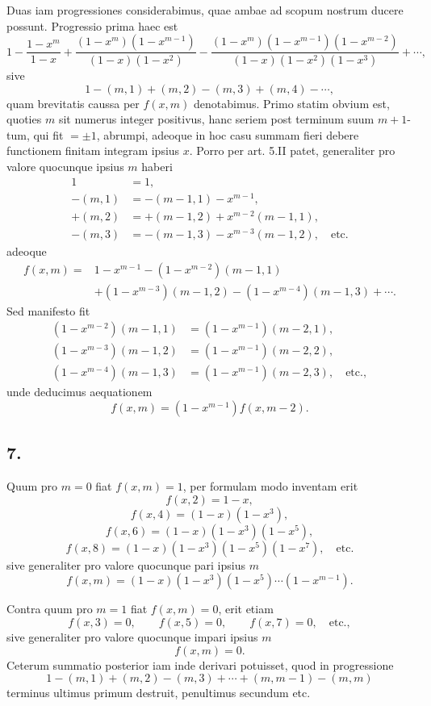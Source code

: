 \documentclass[12pt]{article}
\begin{document}
Duas iam progressiones considerabimus, quae ambae ad scopum nostrum ducere possunt. Progressio prima haec est
\[
1-\frac{1-x^m}{1-x}
+\frac{(1-x^m)(1-x^{m-1})}{(1-x)(1-x^2)}
-\frac{(1-x^m)(1-x^{m-1})(1-x^{m-2})}{(1-x)(1-x^2)(1-x^3)}
+\cdots,
\]
sive
\[
1-(m,1)+(m,2)-(m,3)+(m,4)-\cdots,
\]
quam brevitatis caussa per $f(x,m)$ denotabimus. Primo statim obvium est, quoties $m$ sit numerus integer positivus, hanc seriem post terminum suum $m+1$-tum, qui fit $=\pm1$, abrumpi, adeoque in hoc casu summam fieri debere functionem finitam integram ipsius $x$. Porro per art. 5.II patet, generaliter pro valore quocunque ipsius $m$ haberi
\[
\begin{aligned}
1&=1,\\
-(m,1)&=-(m-1,1)-x^{m-1},\\
+(m,2)&=+(m-1,2)+x^{m-2}(m-1,1),\\
-(m,3)&=-(m-1,3)-x^{m-3}(m-1,2),\quad\text{etc.}
\end{aligned}
\]
adeoque
\[
\begin{aligned}
f(x,m)=&1-x^{m-1}-(1-x^{m-2})(m-1,1)\\
&+(1-x^{m-3})(m-1,2)-(1-x^{m-4})(m-1,3)+\cdots.
\end{aligned}
\]
Sed manifesto fit
\[
\begin{aligned}
(1-x^{m-2})(m-1,1)&=(1-x^{m-1})(m-2,1),\\
(1-x^{m-3})(m-1,2)&=(1-x^{m-1})(m-2,2),\\
(1-x^{m-4})(m-1,3)&=(1-x^{m-1})(m-2,3),\quad\text{etc.},
\end{aligned}
\]
unde deducimus aequationem
\[
f(x,m)=(1-x^{m-1})f(x,m-2). \tag{1}
\]

\subsection*{7.}

Quum pro $m=0$ fiat $f(x,m)=1$, per formulam modo inventam erit
\[
f(x,2)=1-x,
\]
\[
f(x,4)=(1-x)(1-x^3),
\]
\[
f(x,6)=(1-x)(1-x^3)(1-x^5),
\]
\[
f(x,8)=(1-x)(1-x^3)(1-x^5)(1-x^7),\quad\text{etc.}
\]
sive generaliter pro valore quocunque pari ipsius $m$
\[
f(x,m)=(1-x)(1-x^3)(1-x^5)\cdots(1-x^{m-1}). \tag{2}
\]

Contra quum pro $m=1$ fiat $f(x,m)=0$, erit etiam
\[
f(x,3)=0,\qquad f(x,5)=0,\qquad f(x,7)=0,\quad\text{etc.},
\]
sive generaliter pro valore quocunque impari ipsius $m$
\[
f(x,m)=0.
\]
Ceterum summatio posterior iam inde derivari potuisset, quod in progressione
\[
1-(m,1)+(m,2)-(m,3)+\cdots+(m,m-1)-(m,m)
\]
terminus ultimus primum destruit, penultimus secundum etc.
\end{document}
